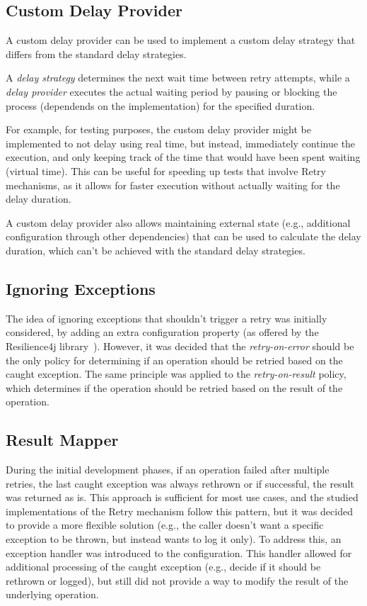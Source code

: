 \subsection{Custom Delay Provider}\label{subsec:retry-custom-delay-provider}

A custom delay provider can be used
to implement a custom delay strategy that differs from the standard delay strategies.

A \textit{delay strategy} determines the next wait time between retry attempts,
while a \textit{delay provider} executes the actual waiting period by pausing or blocking the process
(dependends on the implementation) for the specified duration.

For example, for testing purposes, the custom delay provider might be implemented to not delay using real time,
but instead, immediately continue the execution,
and only keeping track of the time that would have been spent waiting (virtual time).
This can be useful for speeding up tests that involve Retry mechanisms,
as it allows for faster execution without actually waiting for the delay duration.

A custom delay provider also allows maintaining external state
(e.g., additional configuration through other dependencies) that can be used to calculate the delay duration,
which can't be achieved with the standard delay strategies.

\subsection{Ignoring Exceptions}\label{subsec:retry-ignoring-exceptions}

The idea of ignoring exceptions that shouldn’t trigger a retry was initially considered,
by adding an extra configuration property (as offered by the Resilience4j library~\cite{resilience4j-retry}).
However,
it was decided
that the \textit{retry-on-error} should be the only policy
for determining if an operation should be retried based on the caught exception.
The same principle was applied to the \textit{retry-on-result} policy, which determines if the operation should be retried based on the result of the operation.

\subsection{Result Mapper}\label{subsec:retry-result-mapper}

During the initial development phases, if an operation failed after multiple retries,
the last caught exception was always rethrown or if successful, the result was returned as is.
This approach is sufficient for most use cases,
and the studied implementations of the Retry mechanism follow this pattern, but
it was decided to provide a more flexible solution
(e.g., the caller doesn't want a specific exception to be thrown, but instead wants to log it only).
To address this, an exception handler was introduced to the configuration.
This handler allowed for additional processing of the caught exception
(e.g., decide if it should be rethrown or logged),
but still did not provide a way to modify the result of the underlying operation.

